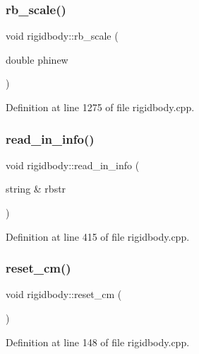 \subsubsection{\texorpdfstring{rb\+\_\+scale()}{rb\_scale()}}
{\footnotesize\ttfamily void rigidbody\+::rb\+\_\+scale (\begin{DoxyParamCaption}\item[{double}]{phinew }\end{DoxyParamCaption})}



Definition at line 1275 of file rigidbody.\+cpp.

\mbox{\label{classrigidbody_a84c05d9190b4cab031ca9ab7cd18cd9e}} 
\subsubsection{\texorpdfstring{read\+\_\+in\+\_\+info()}{read\_in\_info()}}
{\footnotesize\ttfamily void rigidbody\+::read\+\_\+in\+\_\+info (\begin{DoxyParamCaption}\item[{string \&}]{rbstr }\end{DoxyParamCaption})}



Definition at line 415 of file rigidbody.\+cpp.

\mbox{\label{classrigidbody_a3e81aee584c1f57c729d68000637df37}} 
\subsubsection{\texorpdfstring{reset\+\_\+cm()}{reset\_cm()}}
{\footnotesize\ttfamily void rigidbody\+::reset\+\_\+cm (\begin{DoxyParamCaption}{ }\end{DoxyParamCaption})}



Definition at line 148 of file rigidbody.\+cpp.

\mbox{\label{classrigidbody_a0af56b5a8e3c6550c9a45b6a59c262ef}} 
